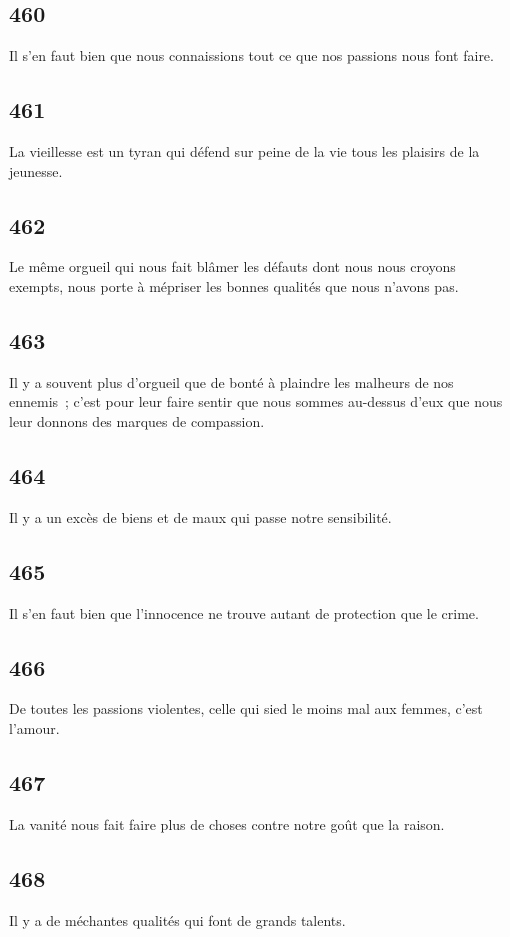 \documentclass[french,twoside]{book} %
\begin{document}
\subsection[{460}]{ \textsc{460} }
\noindent Il s’en faut bien que nous connaissions tout ce que nos passions nous font faire.
\subsection[{461}]{ \textsc{461} }
\noindent La vieillesse est un tyran qui défend sur peine de la vie tous les plaisirs de la jeunesse.
\subsection[{462}]{ \textsc{462} }
\noindent Le même orgueil qui nous fait blâmer les défauts dont nous nous croyons exempts, nous porte à mépriser les bonnes qualités que nous n’avons pas.
\subsection[{463}]{ \textsc{463} }
\noindent Il y a souvent plus d’orgueil que de bonté à plaindre les malheurs de nos ennemis ; c’est pour leur faire sentir que nous sommes au-dessus d’eux que nous leur donnons des marques de compassion.
\subsection[{464}]{ \textsc{464} }
\noindent Il y a un excès de biens et de maux qui passe notre sensibilité.
\subsection[{465}]{ \textsc{465} }
\noindent Il s’en faut bien que l’innocence ne trouve autant de protection que le crime.
\subsection[{466}]{ \textsc{466} }
\noindent De toutes les passions violentes, celle qui sied le moins mal aux femmes, c’est l’amour.
\subsection[{467}]{ \textsc{467} }
\noindent La vanité nous fait faire plus de choses contre notre goût que la raison.
\subsection[{468}]{ \textsc{468} }
\noindent Il y a de méchantes qualités qui font de grands talents.
\end{document}
